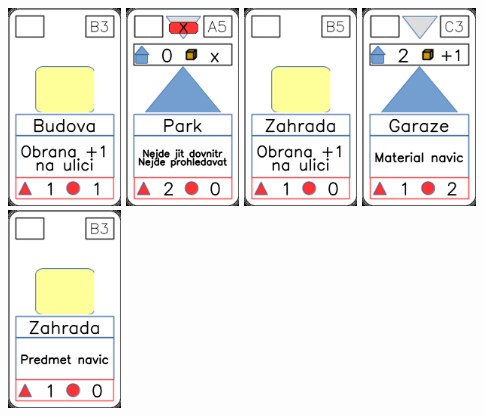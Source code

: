 \documentclass[a4paper]{article}
\begin{document}
	\includegraphics[width=3.0cm]{img-2_7}
	\includegraphics[width=3.0cm]{img-3_19}
	\includegraphics[width=3.0cm]{img-3_24}
	\includegraphics[width=3.0cm]{img-3_12}
	\includegraphics[width=3.0cm]{img-2_22}
\end{document}
